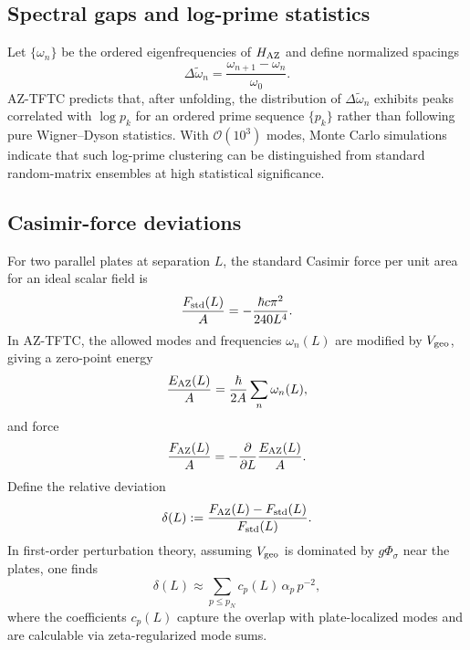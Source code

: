 \documentclass[11pt]{article}
\begin{document}
\subsection{Spectral gaps and log-prime statistics}

Let $\{\omega_n\}$ be the ordered eigenfrequencies of $H_{\rm AZ}$ and define normalized spacings
\begin{equation}
\Delta \tilde{\omega}_n = \frac{\omega_{n+1}-\omega_n}{\omega_0}.
\end{equation}
AZ-TFTC predicts that, after unfolding, the distribution of $\Delta\tilde{\omega}_n$ exhibits peaks correlated with $\log p_k$ for an ordered prime sequence $\{p_k\}$ rather than following pure Wigner--Dyson statistics.
With $\mathcal{O}(10^3)$ modes, Monte Carlo simulations indicate that such log-prime clustering can be distinguished from standard random-matrix ensembles at high statistical significance.

\subsection{Casimir-force deviations}

For two parallel plates at separation $L$, the standard Casimir force per unit area for an ideal scalar field is\cite{CasimirReview,CasimirEffectWiki}
\begin{equation}
\frac{F_{\rm std}(L)}{A} = -\frac{\hbar c \pi^2}{240 L^4}.
\end{equation}
In AZ-TFTC, the allowed modes and frequencies $\omega_n(L)$ are modified by $V_{\rm geo}$, giving a zero-point energy
\begin{equation}
\frac{E_{\rm AZ}(L)}{A} = \frac{\hbar}{2A}\sum_n \omega_n(L),
\end{equation}
and force
\begin{equation}
\frac{F_{\rm AZ}(L)}{A} = -\frac{\partial}{\partial L}\frac{E_{\rm AZ}(L)}{A}.
\end{equation}
Define the relative deviation
\begin{equation}
\delta(L) := \frac{F_{\rm AZ}(L)-F_{\rm std}(L)}{F_{\rm std}(L)}.
\end{equation}
In first-order perturbation theory, assuming $V_{\rm geo}$ is dominated by $g\Phi_\sigma$ near the plates, one finds
\begin{equation}
\delta(L) \approx \sum_{p\le p_N} c_p(L)\,\alpha_p\,p^{-2},
\end{equation}
where the coefficients $c_p(L)$ capture the overlap with plate-localized modes and are calculable via zeta-regularized mode sums.
\end{document}
